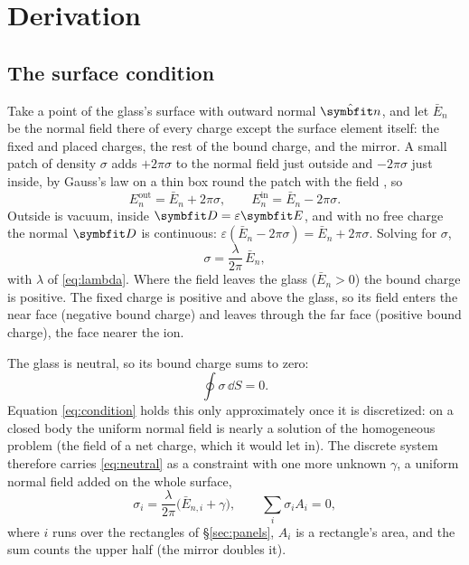 \documentclass{leveldoc}
\begin{document}
\section{Derivation}\label{sec:derivation}

\subsection{The surface condition}\label{sec:condition}

Take a point of the glass's surface with outward normal $\uvec{n}$, and let
$\bar E_n$ be the normal field there of every charge except the surface
element itself: the fixed and placed charges, the rest of the bound charge,
and the mirror. A small patch of density $\sigma$ adds $+2\pi\sigma$ to the
normal field just outside and $-2\pi\sigma$ just inside, by Gauss's law on a
thin box round the patch with the field , so
\[
  E_n^\mathrm{out} = \bar E_n + 2\pi\sigma, \qquad
  E_n^\mathrm{in} = \bar E_n - 2\pi\sigma .
\]
Outside is vacuum, inside $\vect{D} = \varepsilon\vect{E}$, and with no free
charge the normal $\vect{D}$ is continuous:
$\varepsilon(\bar E_n - 2\pi\sigma) = \bar E_n + 2\pi\sigma$. Solving for
$\sigma$,
\begin{equation}\label{eq:condition}
  \sigma = \frac{\lambda}{2\pi}\,\bar E_n ,
\end{equation}
with $\lambda$ of \eqref{eq:lambda}. Where the field leaves the glass
($\bar E_n > 0$) the bound charge is positive. The fixed charge is positive and
above the glass, so its field enters the near face (negative bound charge) and
leaves through the far face (positive bound charge), the face nearer the ion.

The glass is neutral, so its bound charge sums to zero:
\begin{equation}\label{eq:neutral}
  \oint \sigma \,\dd S = 0 .
\end{equation}
Equation \eqref{eq:condition} holds this only approximately once it is
discretized: on a closed body the uniform normal field is nearly a solution of
the homogeneous problem (the field of a net charge, which it would let in).
The discrete system therefore carries \eqref{eq:neutral} as a constraint with
one more unknown $\gamma$, a uniform normal field added on the whole surface,
\begin{equation}\label{eq:bordered}
  \sigma_i = \frac{\lambda}{2\pi}\Big(\bar E_{n,i} + \gamma\Big), \qquad
  \sum_i \sigma_i A_i = 0,
\end{equation}
where $i$ runs over the rectangles of \S\ref{sec:panels}, $A_i$ is a
rectangle's area, and the sum counts the upper half (the mirror doubles it).
\end{document}
